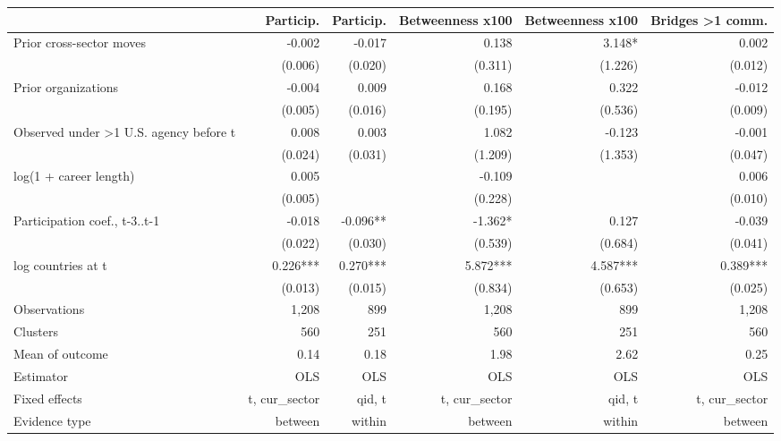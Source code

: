 \begin{tabular}{lrrrrr}
\toprule
 & Particip. & Particip. & Betweenness x100 & Betweenness x100 & Bridges >1 comm. \\
\midrule
Prior cross-sector moves & -0.002 & -0.017 & 0.138 & 3.148* & 0.002 \\
 & (0.006) & (0.020) & (0.311) & (1.226) & (0.012) \\
Prior organizations & -0.004 & 0.009 & 0.168 & 0.322 & -0.012 \\
 & (0.005) & (0.016) & (0.195) & (0.536) & (0.009) \\
Observed under >1 U.S. agency before t & 0.008 & 0.003 & 1.082 & -0.123 & -0.001 \\
 & (0.024) & (0.031) & (1.209) & (1.353) & (0.047) \\
log(1 + career length) & 0.005 &  & -0.109 &  & 0.006 \\
 & (0.005) &  & (0.228) &  & (0.010) \\
Participation coef., t-3..t-1 & -0.018 & -0.096** & -1.362* & 0.127 & -0.039 \\
 & (0.022) & (0.030) & (0.539) & (0.684) & (0.041) \\
log countries at t & 0.226*** & 0.270*** & 5.872*** & 4.587*** & 0.389*** \\
 & (0.013) & (0.015) & (0.834) & (0.653) & (0.025) \\
Observations & 1,208 & 899 & 1,208 & 899 & 1,208 \\
Clusters & 560 & 251 & 560 & 251 & 560 \\
Mean of outcome & 0.14 & 0.18 & 1.98 & 2.62 & 0.25 \\
Estimator & OLS & OLS & OLS & OLS & OLS \\
Fixed effects & t, cur\_sector & qid, t & t, cur\_sector & qid, t & t, cur\_sector \\
Evidence type & between & within & between & within & between \\
\bottomrule
\end{tabular}
\par{}
